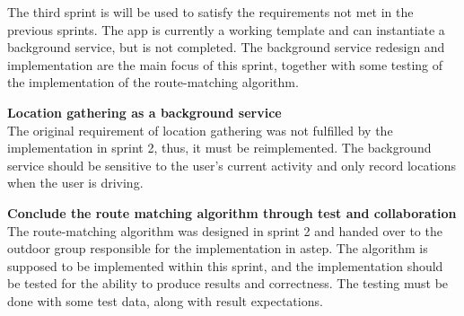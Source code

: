 The third sprint is will be used to satisfy the requirements not met in the previous sprints.
The app is currently a working template and can instantiate a background service, but is not completed. 
The background service redesign and implementation are the main focus of this sprint, together with some testing of the implementation of the route-matching algorithm.

\textbf{Location gathering as a background service}\\
The original requirement of location gathering was not fulfilled by the implementation in sprint 2, thus, it must be reimplemented.
The background service should be sensitive to the user's current activity and only record locations when the user is driving.

\textbf{Conclude the route matching algorithm through test and collaboration}\\
The route-matching algorithm was designed in sprint 2 and handed over to the outdoor group responsible for the implementation in \gls{astep}.
The algorithm is supposed to be implemented within this sprint, and the implementation should be tested for the ability to produce results and correctness.
The testing must be done with some test data, along with result expectations.